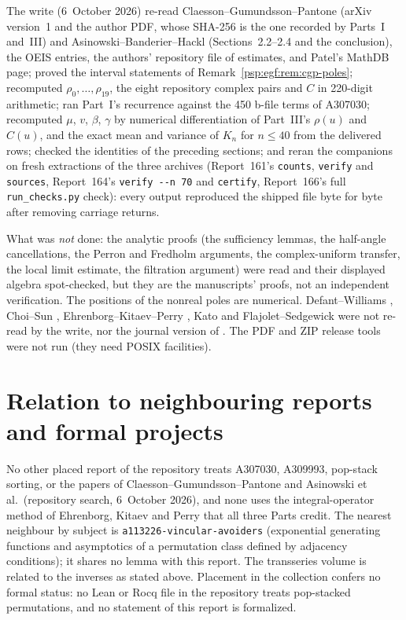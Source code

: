 \documentclass[11pt,letterpaper]{article}
\numberwithin{equation}{section}
\theoremstyle{remark}\newtheorem{remark}[theorem]{Remark}
\newcommand{\file}[1]{\nolinkurl{#1}}
\begin{document}
The write (6~October 2026) re-read Claesson--Gu\dh mundsson--Pantone (arXiv version~1 and the author PDF, whose SHA-256 is the one recorded by Parts~I and~III) and Asinowski--Banderier--Hackl (Sections~2.2--2.4 and the conclusion), the OEIS entries, the authors' repository file of estimates, and Patel's MathDB page; proved the interval statements of Remark~\ref{psp:egf:rem:cgp-poles}; recomputed $\rho_0,\dots,\rho_{19}$, the eight repository complex pairs and $C$ in 220-digit arithmetic; ran Part~I's recurrence against the 450 b-file terms of A307030; recomputed $\mu$, $v$, $\beta$, $\gamma$ by numerical differentiation of Part~III's $\rho(u)$ and $C(u)$, and the exact mean and variance of $K_n$ for $n\le40$ from the delivered rows; checked the identities of the preceding sections; and reran the companions on fresh extractions of the three archives (Report~161's \texttt{counts}, \texttt{verify} and \texttt{sources}, Report~164's \texttt{verify -{}-n 70} and \texttt{certify}, Report~166's full \texttt{run\_checks.py} check): every output reproduced the shipped file byte for byte after removing carriage returns.

What was \emph{not} done: the analytic proofs (the sufficiency lemmas, the half-angle cancellations, the Perron and Fredholm arguments, the complex-uniform transfer, the local limit estimate, the filtration argument) were read and their displayed algebra spot-checked, but they are the manuscripts' proofs, not an independent verification. The positions of the nonreal poles are numerical. Defant--Williams \cite{dw}, Choi--Sun \cite{cs}, Ehrenborg--Kitaev--Perry \cite{ekp}, Kato \cite{kato} and Flajolet--Sedgewick \cite{fs} were not re-read by the write, nor the journal version of \cite{cgp}. The PDF and ZIP release tools were not run (they need POSIX facilities).

\section*{Relation to neighbouring reports and formal projects}\label{psp:sec:neighbours}
No other placed report of the repository treats A307030, A309993, pop-stack sorting, or the papers of Claesson--Gu\dh mundsson--Pantone and Asinowski et al.\ (repository search, 6~October 2026), and none uses the integral-operator method of Ehrenborg, Kitaev and Perry that all three Parts credit. The nearest neighbour by subject is \file{a113226-vincular-avoiders} (exponential generating functions and asymptotics of a permutation class defined by adjacency conditions); it shares no lemma with this report. The transseries volume \cite{TSvol} is related to the inverses as stated above. Placement in the collection confers no formal status: no Lean or Rocq file in the repository treats pop-stacked permutations, and no statement of this report is formalized.
\clearpage
\end{document}
